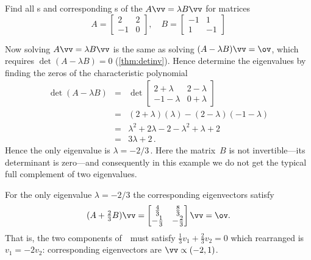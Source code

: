 \begin{reduce}
\begin{example} 
Find all s and corresponding s of the  \(A\vv=\lambda B\vv\) for matrices
\begin{equation*}
A=\begin{bmatrix} 2&2\\-1&0 \end{bmatrix},\quad
B=\begin{bmatrix} -1&1\\1&-1 \end{bmatrix}
\end{equation*}
\begin{solution} 
Now solving \(A\vv=\lambda B\vv\) is the same as solving \((A-\lambda B)\vv=\ov\), which requires \(\det(A-\lambda B)=0\) (\autoref{thm:detinv}).
Hence determine the eigenvalues by finding the zeros of the characteristic polynomial
\begin{eqnarray*}
\det(A-\lambda B)
&=&\det\begin{bmatrix} 2+\lambda&2-\lambda\\-1-\lambda&0+\lambda \end{bmatrix}
\\&=&(2+\lambda)(\lambda)-(2-\lambda)(-1-\lambda)
\\&=&\lambda^2+2\lambda-2-\lambda^2+\lambda+2
\\&=&3\lambda+2\,.
\end{eqnarray*}
Hence the only eigenvalue is \(\lambda=-2/3\)\,.
Here the matrix~\(B\) is not invertible---its determinant is zero---and consequently in this example we do not get the typical full complement of two eigenvalues.

For the only eigenvalue \(\lambda=-2/3\) the corresponding eigenvectors satisfy
\begin{equation*}
(A+\tfrac23B)\vv=\begin{bmatrix} \tfrac43&\tfrac83\\-\tfrac13&-\tfrac23 \end{bmatrix}\vv=\ov.
\end{equation*}
That is, the two components of~\vv\ must satisfy \(\tfrac13v_1+\tfrac23v_2=0\) which rearranged is \(v_1=-2v_2\): corresponding eigenvectors are \(\vv\propto(-2,1)\).
\end{solution}
\end{example}








\end{reduce}
